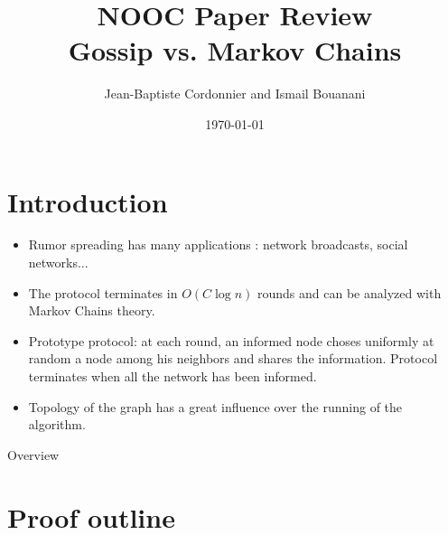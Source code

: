 \documentclass{beamer}
\title{NOOC Paper Review\\Gossip vs. Markov Chains}
\author{Jean-Baptiste Cordonnier and Ismail Bouanani}
\date{\today}
\begin{document}



\frame{\titlepage}
\section*{Introduction}
\begin{frame}
\begin{itemize}
\frametitle{Introduction}
\item Rumor spreading has many applications : network broadcasts, social networks...
\item The protocol  terminates in $O(C \log n)$ rounds and can be analyzed with Markov Chains theory.
\item Prototype protocol: at each round, an informed node choses uniformly at random a node among his neighbors and shares the information. Protocol terminates when all the network has been informed.
\item Topology of the graph has a great influence over the running of the algorithm.

\end{itemize}
\end {frame}

\begin{frame}{Overview}
\tableofcontents
\end{frame}


\section {Proof outline}

\frame{\sectionpage}
\end{document}
